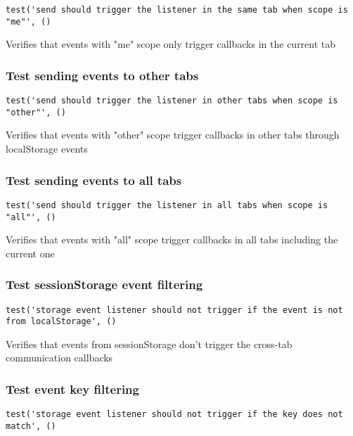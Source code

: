 \documentclass[a4paper]{article}
\begin{document}
\begin{lstlisting}
test('send should trigger the listener in the same tab when scope is "me"', ()
\end{lstlisting}

Verifies that events with "me" scope only trigger callbacks
in the current tab

\hypertarget{toc297}{}
\subsubsection{Test sending events to other tabs}

\begin{lstlisting}
test('send should trigger the listener in other tabs when scope is "other"', ()
\end{lstlisting}

Verifies that events with "other" scope trigger callbacks
in other tabs through localStorage events

\hypertarget{toc298}{}
\subsubsection{Test sending events to all tabs}

\begin{lstlisting}
test('send should trigger the listener in all tabs when scope is "all"', ()
\end{lstlisting}

Verifies that events with "all" scope trigger callbacks
in all tabs including the current one

\hypertarget{toc299}{}
\subsubsection{Test sessionStorage event filtering}

\begin{lstlisting}
test('storage event listener should not trigger if the event is not from localStorage', ()
\end{lstlisting}

Verifies that events from sessionStorage don't trigger
the cross-tab communication callbacks

\hypertarget{toc300}{}
\subsubsection{Test event key filtering}

\begin{lstlisting}
test('storage event listener should not trigger if the key does not match', ()
\end{lstlisting}
\end{document}
